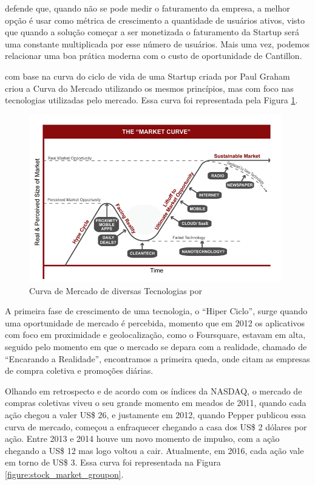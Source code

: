  defende que, quando não se pode medir o faturamento da empresa, a melhor opção é usar como métrica de crescimento a quantidade de usuários ativos, visto que quando a solução começar a ser monetizada o faturamento da Startup será uma constante multiplicada por esse número de usuários. Mais uma vez, podemos relacionar uma boa prática moderna com o custo de oportunidade de Cantillon.

 com base na curva do ciclo de vida de uma Startup criada por Paul Graham criou a Curva do Mercado utilizando os mesmos princípios, mas com foco nas tecnologias utilizadas pelo mercado. Essa curva foi representada pela Figura \ref{figure:market_curve}.

\begin{figure}[!htb]
\centering
\includegraphics[width=11cm,angle=0]{figuras/market_curve}
\caption{Curva de Mercado de diversas Tecnologias por \cite{Pepper2012}}
\label{figure:market_curve}
\end{figure}

A primeira fase de crescimento de uma tecnologia, o ``Hiper Ciclo'', surge quando uma oportunidade de mercado é percebida, momento que em 2012 os aplicativos com foco em proximidade e geolocalização, como o Foursquare, estavam em alta, seguido pelo momento em que o mercado se depara com a realidade, chamado de ``Encarando a Realidade'', encontramos a primeira queda, onde citam as empresas de compra coletiva e promoções diárias.

Olhando em retrospecto e de acordo com os índices da NASDAQ, o mercado de compras coletivas viveu o seu grande momento em meados de 2011, quando cada ação chegou a valer US\$ 26, e justamente em 2012, quando Pepper publicou essa curva de mercado, começou a enfraquecer chegando a casa dos US\$ 2 dólares por ação. Entre 2013 e 2014 houve um novo momento de impulso, com a ação chegando a US\$ 12 mas logo voltou a cair. Atualmente, em 2016, cada ação vale em torno de US\$ 3. Essa curva foi representada na Figura \ref{figure:stock_market_groupon}.

